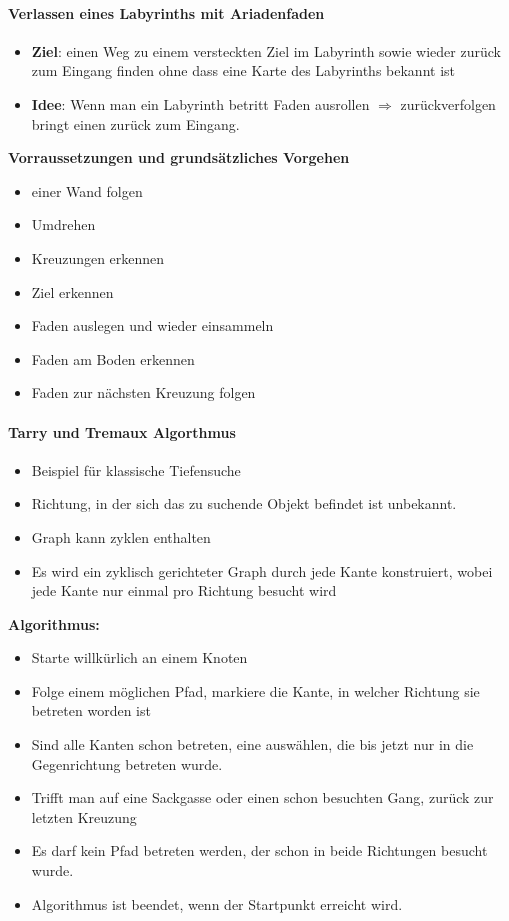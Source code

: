 \paragraph{Verlassen eines Labyrinths mit Ariadenfaden}
\begin{itemize}
	\item \textbf{Ziel}: einen Weg zu einem versteckten Ziel im Labyrinth sowie wieder zurück zum Eingang finden ohne dass eine Karte des Labyrinths bekannt ist
	\item \textbf{Idee}: Wenn man ein Labyrinth betritt Faden ausrollen $\Rightarrow$ zurückverfolgen bringt einen zurück zum Eingang.
\end{itemize}
\textbf{Vorraussetzungen und grundsätzliches Vorgehen}
\begin{itemize}
	\item einer Wand folgen
	\item Umdrehen
	\item Kreuzungen erkennen
	\item Ziel erkennen
	\item Faden auslegen und wieder einsammeln
	\item Faden am Boden erkennen
	\item Faden zur nächsten Kreuzung folgen
\end{itemize}
\paragraph{Tarry und Tremaux Algorthmus}
\begin{itemize}
	\item Beispiel für klassische Tiefensuche
	\item Richtung, in der sich das zu suchende Objekt befindet ist unbekannt.
	\item Graph kann zyklen enthalten
	\item Es wird ein zyklisch gerichteter Graph durch jede Kante konstruiert, wobei jede Kante nur einmal pro Richtung besucht wird
\end{itemize}
\textbf{Algorithmus:}
\begin{itemize}
	\item Starte willkürlich an einem Knoten
	\item Folge einem möglichen Pfad, markiere die Kante, in welcher Richtung sie betreten worden ist
	\item Sind alle Kanten schon betreten, eine auswählen, die bis jetzt nur in die Gegenrichtung betreten wurde.
	\item Trifft man auf eine Sackgasse oder einen schon besuchten Gang, zurück zur letzten Kreuzung
	\item Es darf kein Pfad betreten werden, der schon in beide Richtungen besucht wurde.
	\item Algorithmus ist beendet, wenn der Startpunkt erreicht wird.
\end{itemize}
